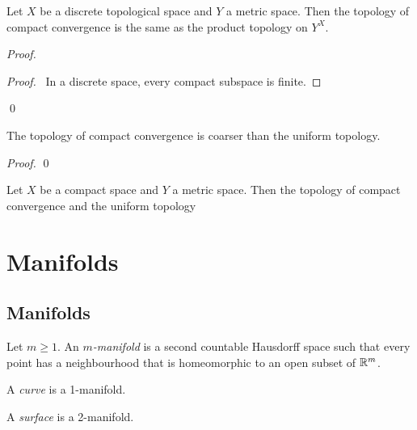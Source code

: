 \begin{proposition}
    Let $X$ be a discrete topological space and $Y$ a metric space. Then the topology of compact convergence
    is the same as the product topology on $Y^X$.
\end{proposition}

\begin{proof}
    \pf
    \begin{proof}
        \pf\ In a discrete space, every compact subspace is finite.
    \end{proof}
    \qed
\end{proof}

\begin{proposition}
    The topology of compact convergence is coarser than the uniform topology.
\end{proposition}

\begin{proof}
    \pf
    \qed
\end{proof}

\begin{proposition}
    Let $X$ be a compact space and $Y$ a metric space. Then the topology of compact convergence and the uniform topology 
\end{proposition}
\chapter{Manifolds}

\section{Manifolds}

\begin{definition}[Manifold]
    Let $m \geq 1$. An \emph{$m$-manifold} is a second countable Hausdorff space such that every point has a neighbourhood that is
    homeomorphic to an open subset of $\mathbb{R}^m$.

    A \emph{curve} is a 1-manifold.

    A \emph{surface} is a 2-manifold.
\end{definition}

